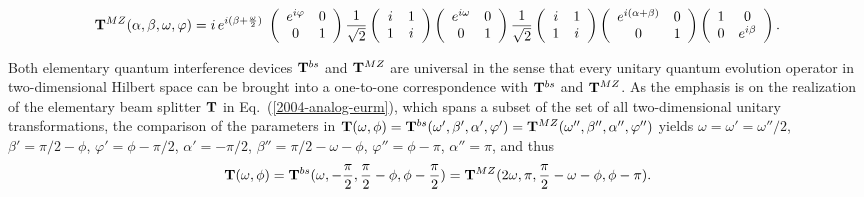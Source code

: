 \documentclass[pra,preprint,showpacs,showkeys,amsfonts]{revtex4}
\begin{document}
\begin{equation}
{\bf T}^{MZ} (\alpha ,\beta ,\omega ,\varphi )=
i \, e^{i(\beta +{\omega \over 2})}\;
\left(
\begin{array}{cc}
e^{i\varphi }& 0\\
0& 1
 \end{array}
\right)
{1\over \sqrt{2}}\left(
\begin{array}{cc}
i& 1\\
1& i
 \end{array}
\right)
\left(
\begin{array}{cc}
e^{i\omega}& 0\\
0&1
 \end{array}
\right)
{1\over \sqrt{2}}\left(
\begin{array}{cc}
i& 1\\
1& i
 \end{array}
\right)
\left(
\begin{array}{cc}
e^{i(\alpha+\beta )}& 0\\
0&1
 \end{array}
\right)
\left(
\begin{array}{cc}
1& 0\\
0& e^{i\beta}
 \end{array}
\right)
 .
\label{e:quid2mm}
\end{equation}



Both elementary quantum interference devices
${\bf T}^{bs}$
and
${\bf T}^{MZ}$
are  universal in the
sense that
 every unitary quantum
evolution operator in two-dimensional Hilbert space can be brought into a
one-to-one correspondence with
${\bf T}^{bs}$
and
${\bf T}^{MZ}$.
As the emphasis is on the realization of the elementary beam splitter
${\bf T}$ in Eq.~(\ref{2004-analog-eurm}),
which spans a subset of the set of all two-dimensional unitary transformations,
the comparison of the parameters in
${\bf T}(\omega ,\phi )=
{\bf T}^{bs}(\omega ',\beta ',\alpha ',\varphi ')=
{\bf T}^{MZ}(\omega '',\beta '',\alpha '',\varphi '')$
yields
$\omega =\omega' =\omega''/2$,
$\beta'=\pi /2 -\phi$,
$\varphi'=\phi-\pi /2$,
$\alpha'=-\pi /2$,
$\beta''=\pi /2 - \omega -\phi$,
$\varphi''=\phi - \pi $,
$\alpha''=\pi $,
and thus
\begin{equation}
{\bf T} (\omega ,\phi ) =
{\bf T}^{bs} (\omega ,- {\pi \over 2 },{\pi \over 2} -\phi ,\phi-{\pi \over  2} ) =
{\bf T}^{MZ} (2\omega ,\pi  ,{\pi \over 2} - \omega -\phi ,\phi - \pi  )
.
\end{equation}
\end{document}
